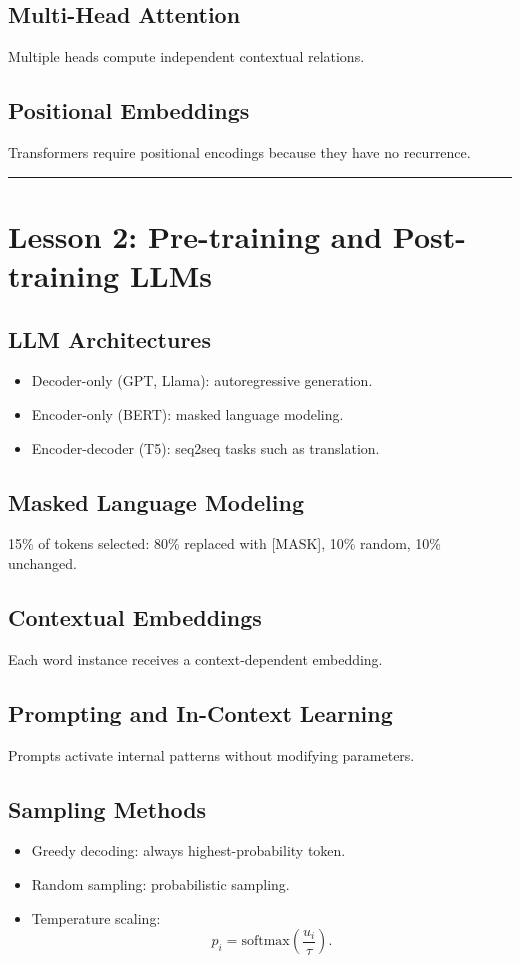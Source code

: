 \documentclass[12pt]{article}
\begin{document}
\subsection*{Multi-Head Attention}
Multiple heads compute independent contextual relations.

\subsection*{Positional Embeddings}
Transformers require positional encodings because they have no recurrence.

\bigskip
\hrule
\bigskip

\section*{Lesson 2: Pre-training and Post-training LLMs}

\subsection*{LLM Architectures}
\begin{itemize}
    \item Decoder-only (GPT, Llama): autoregressive generation.
    \item Encoder-only (BERT): masked language modeling.
    \item Encoder-decoder (T5): seq2seq tasks such as translation.
\end{itemize}

\subsection*{Masked Language Modeling}
15\% of tokens selected: 80\% replaced with [MASK], 10\% random, 10\% unchanged.

\subsection*{Contextual Embeddings}
Each word instance receives a context-dependent embedding.

\subsection*{Prompting and In-Context Learning}
Prompts activate internal patterns without modifying parameters.

\subsection*{Sampling Methods}
\begin{itemize}
    \item Greedy decoding: always highest-probability token.
    \item Random sampling: probabilistic sampling.
    \item Temperature scaling:
    \[
    p_i = \mathrm{softmax}\left(\frac{u_i}{\tau}\right).
    \]
\end{itemize}
\end{document}
